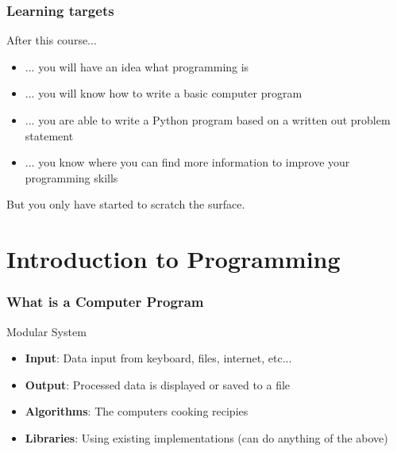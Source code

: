 \documentclass[10pt, a4paper]{beamer} %
\begin{document}

\begin{frame}[c]\frametitle{Learning targets}

  After this course...
  \begin{itemize}
    \item ... you will have an idea what programming is
    \item ... you will know how to write a basic computer program
    \item ... you are able to write a Python program based on a written out
          problem statement
    \item ... you know where you can find more information to improve your
          programming skills
  \end{itemize}

  But you only have started to scratch the surface.
\end{frame}


\section{Introduction to Programming} %
\label{sec:introduction_to_programming}

\begin{frame}[c]\frametitle{What is a Computer Program}
  \begin{block}{Modular System}
    \begin{itemize}
      \item \textbf{Input}: Data input from keyboard, files, internet, etc...
      \item \textbf{Output}: Processed data is displayed or saved to a file
      \item \textbf{Algorithms}: The computers cooking recipies
      \item \textbf{Libraries}: Using existing implementations (can do anything of the above)
    \end{itemize}

  \end{block}
\end{frame}
\end{document}
